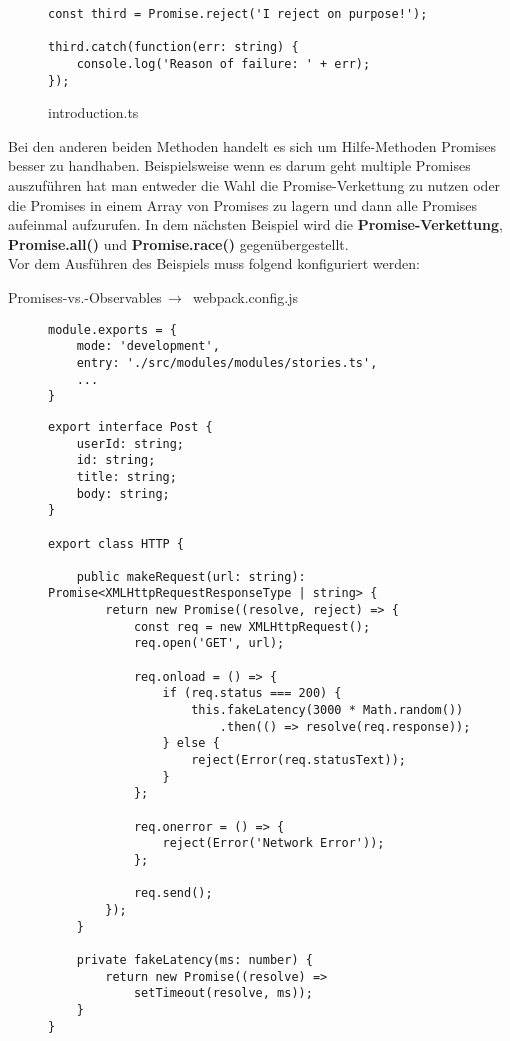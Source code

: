 \begin{figure}[H]
\begin{lstlisting}
const third = Promise.reject('I reject on purpose!');

third.catch(function(err: string) {
    console.log('Reason of failure: ' + err);
});
\end{lstlisting}
\caption{introduction.ts}
\end{figure}

\noindent
Bei den anderen beiden Methoden handelt es sich um Hilfe-Methoden Promises besser zu handhaben. Beispielsweise wenn es darum geht multiple Promises auszuführen hat man entweder die Wahl die Promise-Verkettung zu nutzen oder die Promises in einem Array von Promises zu lagern und dann alle Promises aufeinmal aufzurufen. In dem nächsten Beispiel wird die \textbf{Promise-Verkettung}, \textbf{Promise.all()} und \textbf{Promise.race()} gegenübergestellt.\\

\noindent
Vor dem Ausführen des Beispiels muss folgend konfiguriert werden:

 \begin{center}
     Promises-vs.-Observables$\,\to\,$ webpack.config.js
 \end{center}

\begin{figure}[H]
\begin{lstlisting}
module.exports = {
    mode: 'development',
    entry: './src/modules/modules/stories.ts',
    ...
}
\end{lstlisting}
\end{figure}


\begin{figure}[H]
\begin{lstlisting}
export interface Post {
    userId: string;
    id: string;
    title: string;
    body: string;
}

export class HTTP {

    public makeRequest(url: string): Promise<XMLHttpRequestResponseType | string> {
        return new Promise((resolve, reject) => {
            const req = new XMLHttpRequest();
            req.open('GET', url);

            req.onload = () => {
                if (req.status === 200) {
                    this.fakeLatency(3000 * Math.random())
                        .then(() => resolve(req.response));
                } else {
                    reject(Error(req.statusText));
                }
            };

            req.onerror = () => {
                reject(Error('Network Error'));
            };

            req.send();
        });
    }

    private fakeLatency(ms: number) {
        return new Promise((resolve) =>
            setTimeout(resolve, ms));
    }
}
\end{lstlisting}
\end{figure}


